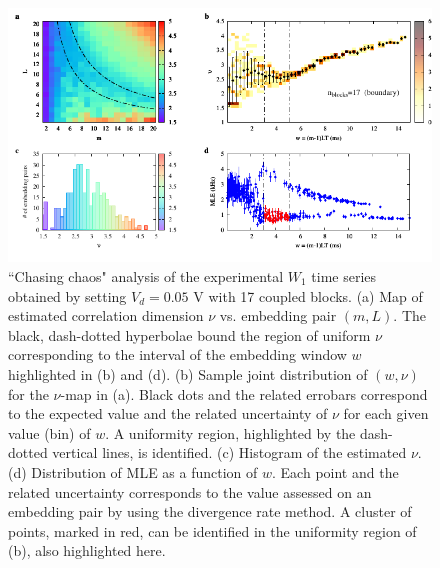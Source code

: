 \begin{figure}[H]
    \centering
    \includegraphics[width=\linewidth]{../blocks/17_blocks/edge/2e5_points/plots/chaos_low.pdf}
    \caption{``Chasing chaos" analysis of the experimental $W_1$ time series obtained by setting $V_d=0.05$ V with 17 coupled blocks.
    (a) Map of estimated correlation dimension $\nu$ vs. embedding pair $(m, L)$.
    The black, dash-dotted hyperbolae bound the region of uniform $\nu$ corresponding to the interval of the
    embedding window $w$ highlighted in (b) and (d).
    (b) Sample joint distribution of $(w,\nu)$ for the $\nu$-map in (a).
    Black dots and the related errobars correspond to the expected value and the related uncertainty of $\nu$
    for each given value (bin) of $w$. A uniformity region, highlighted by the dash-dotted vertical lines,
    is identified. (c) Histogram of the estimated $\nu$. (d) Distribution of MLE as a function of $w$. Each point and the related
    uncertainty corresponds to the value assessed on an embedding pair by using the divergence rate method.
    A cluster of points, marked in red, can be identified in the uniformity region of (b), also highlighted here.}
    \label{fig:17 blocks chaos}
\end{figure}


